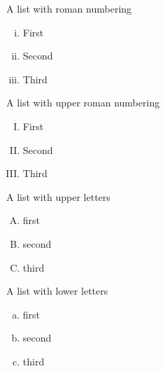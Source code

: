 \documentclass[DIV=12,%
               BCOR=0mm,%
               fontsize=10pt,%
               oneside,%
               paper=210mm:11in]{scrbook}
\begin{document}
A list with roman numbering


\begin{enumerate}[i.]
\item\relax 
First



\item\relax 
Second



\item\relax 
Third




\end{enumerate}

A list with upper roman numbering


\begin{enumerate}[I.]
\item\relax 
First



\item\relax 
Second



\item\relax 
Third




\end{enumerate}

A list with upper letters


\begin{enumerate}[A.]
\item\relax 
first



\item\relax 
second



\item\relax 
third




\end{enumerate}

A list with lower letters


\begin{enumerate}[a.]
\item\relax 
first



\item\relax 
second



\item\relax 
third




\end{enumerate}
\end{document}

